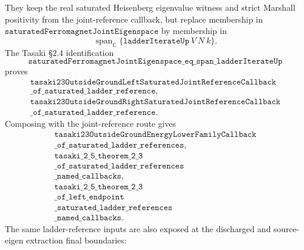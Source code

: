 \documentclass[a4paper,11pt]{article}
\begin{document}
They keep the real saturated Heisenberg eigenvalue witness and strict
Marshall positivity from the joint-reference callback, but replace
membership in
\(\texttt{saturatedFerromagnetJointEigenspace}\) by membership in
\[
  \operatorname{span}_{\mathbb C}
    \{\texttt{ladderIterateUp}\ V\ N\ k\}.
\]
The Tasaki \S2.4 identification
\[
\texttt{saturatedFerromagnetJointEigenspace\_eq\_span\_ladderIterateUp}
\]
proves
\[
\begin{gathered}
\texttt{tasaki23OutsideGroundLeftSaturatedJointReferenceCallback}\\
\texttt{\_of\_saturated\_ladder\_reference},\\
\texttt{tasaki23OutsideGroundRightSaturatedJointReferenceCallback}\\
\texttt{\_of\_saturated\_ladder\_reference}.
\end{gathered}
\]
Composing with the joint-reference route gives
\[
\begin{gathered}
\texttt{tasaki23OutsideGroundEnergyLowerFamilyCallback}\\
\texttt{\_of\_saturated\_ladder\_references},\\
\texttt{tasaki\_2\_5\_theorem\_2\_3}\\
\texttt{\_of\_saturated\_ladder\_references}\\
\texttt{\_named\_callbacks},\\
\texttt{tasaki\_2\_5\_theorem\_2\_3}\\
\texttt{\_of\_left\_endpoint}\\
\texttt{\_saturated\_ladder\_references}\\
\texttt{\_named\_callbacks}.
\end{gathered}
\]
The same ladder-reference inputs are also exposed at the discharged and
source-eigen extraction final boundaries:
\end{document}
